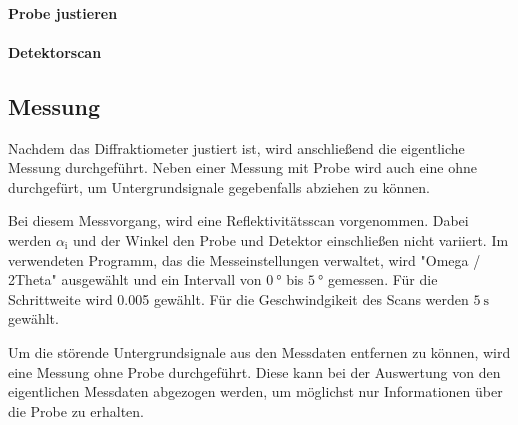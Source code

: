\paragraph{Probe justieren}


\paragraph{Detektorscan}
















\subsection{Messung}
\label{subsec:messung}
Nachdem das Diffraktiometer justiert ist, wird anschließend
die eigentliche Messung durchgeführt.
Neben einer Messung mit Probe wird auch eine ohne durchgefürt,
um Untergrundsignale gegebenfalls abziehen zu können.

Bei diesem Messvorgang, wird eine Reflektivitätsscan vorgenommen.
Dabei werden $\alpha_{\text{i}}$ und der Winkel den Probe und Detektor einschließen nicht
variiert. Im verwendeten Programm, das die Messeinstellungen verwaltet, wird
"Omega / 2Theta" ausgewählt und ein Intervall von $\SI{0}{\degree}$ bis
$\SI{5}{\degree}$ gemessen.
Für die Schrittweite wird 0.005 %
gewählt. Für die Geschwindgikeit des Scans werden $\SI{5}{\second}$ gewählt.


Um die störende Untergrundsignale aus den Messdaten entfernen zu können,
wird eine Messung ohne Probe durchgeführt. Diese kann bei der Auswertung
von den eigentlichen Messdaten abgezogen werden, um möglichst nur
Informationen über die Probe zu erhalten.
